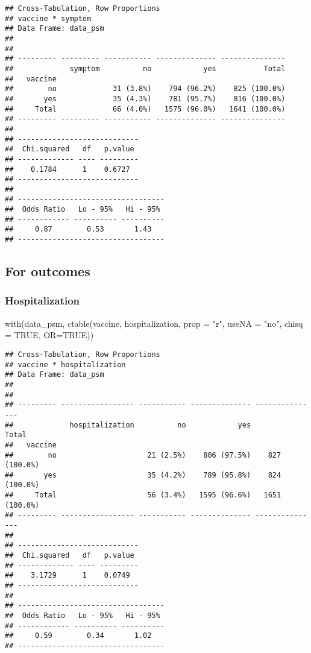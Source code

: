 \documentclass[
]{article}
\newenvironment{Shaded}{\begin{snugshade}}{\end{snugshade}}
\newcommand{\AttributeTok}[1]{\textcolor[rgb]{0.77,0.63,0.00}{#1}}
\newcommand{\ConstantTok}[1]{\textcolor[rgb]{0.00,0.00,0.00}{#1}}
\newcommand{\FunctionTok}[1]{\textcolor[rgb]{0.00,0.00,0.00}{#1}}
\newcommand{\NormalTok}[1]{#1}
\newcommand{\StringTok}[1]{\textcolor[rgb]{0.31,0.60,0.02}{#1}}
\begin{document}
\begin{verbatim}
## Cross-Tabulation, Row Proportions  
## vaccine * symptom  
## Data Frame: data_psm  
## 
## 
## --------- --------- ----------- -------------- ---------------
##             symptom          no            yes           Total
##   vaccine                                                     
##        no             31 (3.8%)    794 (96.2%)    825 (100.0%)
##       yes             35 (4.3%)    781 (95.7%)    816 (100.0%)
##     Total             66 (4.0%)   1575 (96.0%)   1641 (100.0%)
## --------- --------- ----------- -------------- ---------------
## 
## ----------------------------
##  Chi.squared   df   p.value 
## ------------- ---- ---------
##    0.1784      1    0.6727  
## ----------------------------
## 
## ----------------------------------
##  Odds Ratio   Lo - 95%   Hi - 95% 
## ------------ ---------- ----------
##     0.87        0.53       1.43   
## ----------------------------------
\end{verbatim}

\hypertarget{for-outcomes}{%
\subsection{For outcomes}\label{for-outcomes}}

\hypertarget{hospitalization-1}{%
\subsubsection{Hospitalization}\label{hospitalization-1}}

\begin{Shaded}
\begin{Highlighting}[]
\FunctionTok{with}\NormalTok{(data\_psm, }\FunctionTok{ctable}\NormalTok{(vaccine, hospitalization, }\AttributeTok{prop =} \StringTok{"r"}\NormalTok{, }\AttributeTok{useNA =} \StringTok{"no"}\NormalTok{, }\AttributeTok{chisq =} \ConstantTok{TRUE}\NormalTok{, }\AttributeTok{OR=}\ConstantTok{TRUE}\NormalTok{))}
\end{Highlighting}
\end{Shaded}

\begin{verbatim}
## Cross-Tabulation, Row Proportions  
## vaccine * hospitalization  
## Data Frame: data_psm  
## 
## 
## --------- ----------------- ----------- -------------- ---------------
##             hospitalization          no            yes           Total
##   vaccine                                                             
##        no                     21 (2.5%)    806 (97.5%)    827 (100.0%)
##       yes                     35 (4.2%)    789 (95.8%)    824 (100.0%)
##     Total                     56 (3.4%)   1595 (96.6%)   1651 (100.0%)
## --------- ----------------- ----------- -------------- ---------------
## 
## ----------------------------
##  Chi.squared   df   p.value 
## ------------- ---- ---------
##    3.1729      1    0.0749  
## ----------------------------
## 
## ----------------------------------
##  Odds Ratio   Lo - 95%   Hi - 95% 
## ------------ ---------- ----------
##     0.59        0.34       1.02   
## ----------------------------------
\end{verbatim}
\end{document}
